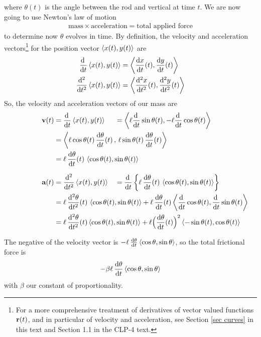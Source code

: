 where $\theta(t)$ is the angle between the rod and vertical at time $t$.
We are now going to use Newton's law of motion
\begin{align*}
\text{mass}\times\text{acceleration}=\text{total applied force}
\end{align*}
to determine now $\theta$ evolves in time. By definition, the
velocity and acceleration vectors\footnote{For a more comprehensive treatment 
of derivatives of vector valued functions $\mathbf{r}(t)$, and in particular of
velocity and acceleration, see Section \ref{sec curves} in this text and
Section 1.1 in the CLP-4 text.} for the position vector 
$\left< x(t),y(t)\right>$ are
\begin{align*}
\diff{}{t}\llt x(t),y(t)\rgt 
   &= \llt \diff{x}{t}(t),\diff{y}{t}(t)\rgt \\
\ddiff{2}{}{t}\llt x(t),y(t)\rgt 
   &=\llt \ddiff{2}{x}{t}(t),\ddiff{2}{y}{t}(t)\rgt 
\end{align*}
So, the velocity and acceleration vectors of our mass are
\begin{alignat*}{3}
\vv(t)&=\diff{}{t}\llt x(t),y(t)\rgt 
&&=\llt \ell\diff{}{t}\sin\theta(t),-\ell\diff{}{t}\cos\theta(t)\rgt \\
&=\llt \ell\cos\theta(t)\,\diff{\theta}{t}(t)\,,\,
             \ell\sin\theta(t)\,\diff{\theta}{t}(t)\rgt\hidewidth \\
&=\ell\,\diff{\theta}{t}(t)\,\llt \cos\theta(t),\sin\theta(t)\rgt \hidewidth
  \\[0.1in]
\va(t)&=\ddiff{2}{}{t}\llt x(t),y(t)\rgt 
&&=\diff{}{t}
  \left\{\ell\,\diff{\theta}{t}(t)\,
               \llt \cos\theta(t),\sin\theta(t)\rgt \right\} \\ 
&=\ell\,\ddiff{2}{\theta}{t}(t)\,\llt \cos\theta(t),\sin\theta(t)\rgt 
+\ell\,\diff{\theta}{t}(t)
       \llt \diff{}{t}\cos\theta(t),\diff{}{t}\sin\theta(t)\rgt \,\hidewidth\\
&= \ell\,\ddiff{2}{\theta}{t}(t)\llt \cos\theta(t),\sin\theta(t)\rgt 
+\ell \Big(\diff{\theta}{t}(t)\Big)^2
     \llt -\sin\theta(t),\cos\theta(t)\rgt\hidewidth
\end{alignat*}

The negative of the velocity vector is  
$- \ell\, \diff{\theta}{t}\llt \cos\theta,\sin\theta\rgt$, so the total frictional force is 
\begin{equation*}
-\beta\ell\, \diff{\theta}{t}\llt \cos\theta,\sin\theta\rgt 
\end{equation*} 
with $\beta$ our constant of proportionality. 

